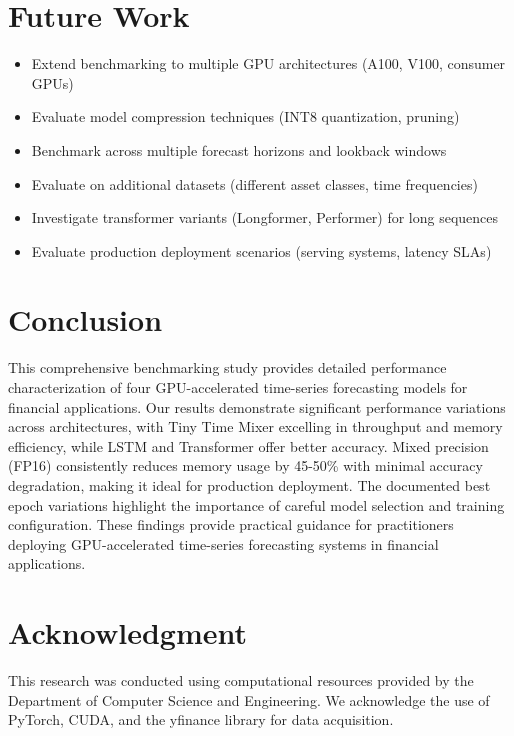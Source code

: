 \documentclass[10pt,a4paper]{article}
\begin{document}
\section{Future Work}
\begin{itemize}
    \item Extend benchmarking to multiple GPU architectures (A100, V100, consumer GPUs)
    \item Evaluate model compression techniques (INT8 quantization, pruning)
    \item Benchmark across multiple forecast horizons and lookback windows
    \item Evaluate on additional datasets (different asset classes, time frequencies)
    \item Investigate transformer variants (Longformer, Performer) for long sequences
    \item Evaluate production deployment scenarios (serving systems, latency SLAs)
\end{itemize}

\section{Conclusion}
This comprehensive benchmarking study provides detailed performance characterization of four GPU-accelerated time-series forecasting models for financial applications. Our results demonstrate significant performance variations across architectures, with Tiny Time Mixer excelling in throughput and memory efficiency, while LSTM and Transformer offer better accuracy. Mixed precision (FP16) consistently reduces memory usage by 45-50\% with minimal accuracy degradation, making it ideal for production deployment. The documented best epoch variations highlight the importance of careful model selection and training configuration. These findings provide practical guidance for practitioners deploying GPU-accelerated time-series forecasting systems in financial applications.

\section*{Acknowledgment}
This research was conducted using computational resources provided by the Department of Computer Science and Engineering. We acknowledge the use of PyTorch, CUDA, and the yfinance library for data acquisition.
\end{document}
